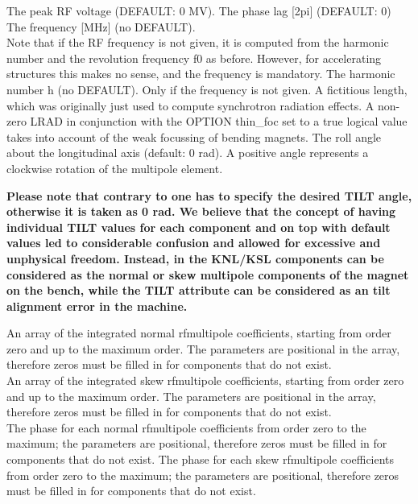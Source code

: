 \begin{madlist}
    The peak RF voltage (DEFAULT: 0 MV).  
    The phase lag [2pi] (DEFAULT: 0) 
    The frequency [MHz] (no DEFAULT). \\ 
     Note that if the RF
     frequency is not given, it is computed from the harmonic
     number and the revolution frequency f0 as before. However, for
     accelerating structures this makes no sense, and the frequency
     is mandatory.  
    The harmonic number h (no DEFAULT). Only if the
     frequency is not given. 
    A fictitious length, which was originally just used to
     compute synchrotron radiation effects. A non-zero LRAD in
     conjunction with the OPTION thin\_foc set to a true logical value
     takes into account of the weak focussing of bending magnets.  
    The roll angle about the longitudinal axis (default: 0
     rad). A positive angle represents a clockwise rotation of the
     multipole element.            

     \textbf{Please note that contrary to \madeight one has to specify the
       desired TILT angle, otherwise it is taken as 0 rad. We
       believe that the \madeight concept of having individual TILT
       values for each component and on top with default values
       led to considerable confusion and allowed for excessive
       and unphysical freedom. Instead, in \madx the KNL/KSL
       components can be considered as the normal or skew
       multipole components of the magnet on the bench, while the
       TILT attribute can be considered as an tilt alignment
       error in the machine.} 

    An array of the integrated normal rfmultipole
     coefficients, starting from order zero and up to the maximum
     order. The parameters are positional in the array, therefore zeros
     must be filled in for components that do not exist. \\ 
    An array of the integrated skew rfmultipole
     coefficients, starting from order zero and up to the maximum
     order. The parameters are positional in the array, therefore zeros
     must be filled in for components that do not exist.\\ 

    The phase for each normal rfmultipole coefficients from
     order zero to the maximum; the parameters are positional,
     therefore zeros must be filled in for components that do not
     exist.  
    The phase for each skew rfmultipole coefficients from
     order zero to the maximum; the parameters are positional,
     therefore zeros must be filled in for components that do not
     exist.  
\end{madlist}


